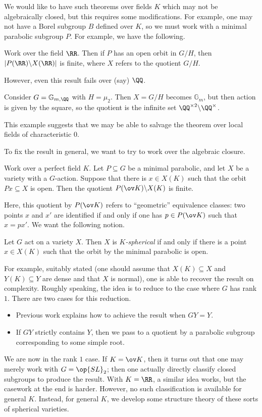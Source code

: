 \documentclass{article}
\begin{document}
We would like to have such theorems over fields $K$ which may not be algebraically closed, but this requires some modifications. For example, one may not have a Borel subgroup $B$ defined over $K$, so we must work with a minimal parabolic subgroup $P$. For example, we have the following.
\begin{theorem}
	Work over the field $\RR$. Then if $P$ has an open orbit in $G/H$, then $\left|P(\RR)\backslash X(\RR)\right|$ is finite, where $X$ refers to the quotient $G/H$.
\end{theorem}
However, even this result fails over (say) $\QQ$.
\begin{example}
	Consider $G=\mathbb G_{m,\QQ}$ with $H=\mu_2$. Then $X=G/H$ becomes $\mathbb G_m$, but then action is given by the square, so the quotient is the infinite set $\QQ^{\times2}\backslash\QQ^\times$.
\end{example}
\begin{remark}
	This example suggests that we may be able to salvage the theorem over local fields of characteristic $0$.
\end{remark}
To fix the result in general, we want to try to work over the algebraic closure.
\begin{theorem}
	Work over a perfect field $K$. Let $P\subseteq G$ be a minimal parabolic, and let $X$ be a variety with a $G$-action. Suppose that there is $x\in X(K)$ such that the orbit $Px\subseteq X$ is open. Then the quotient $P(\ov K)\backslash X(K)$ is finite.
\end{theorem}
Here, this quotient by $P(\ov K)$ refers to ``geometric'' equivalence classes: two points $x$ and $x'$ are identified if and only if one has $p\in P(\ov K)$ such that $x=px'$. We want the following notion.
\begin{definition}
	Let $G$ act on a variety $X$. Then $X$ is \textit{$K$-spherical} if and only if there is a point $x\in X(K)$ such that the orbit by the minimal parabolic is open.
\end{definition}
For example, suitably stated (one should assume that $X(K)\subseteq X$ and $Y(K)\subseteq Y$ are dense and that $X$ is normal), one is able to recover the result on complexity. Roughly speaking, the idea is to reduce to the case where $G$ has rank $1$. There are two cases for this reduction.
\begin{itemize}
	\item Previous work explains how to achieve the result when $GY=Y$.
	\item If $GY$ strictly contains $Y$, then we pass to a quotient by a parabolic subgroup corresponding to some simple root.
\end{itemize}
We are now in the rank $1$ case. If $K=\ov K$, then it turns out that one may merely work with $G=\op{SL}_2$; then one actually directly classify closed subgroups to produce the result. With $K=\RR$, a similar idea works, but the casework at the end is harder. However, no such classification is available for general $K$. Instead, for general $K$, we develop some structure theory of these sorts of spherical varieties.
\end{document}
